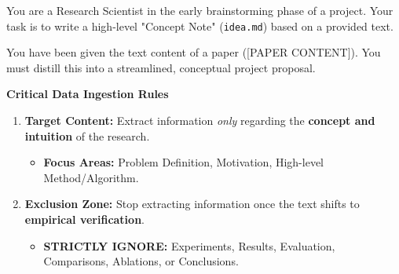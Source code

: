 \noindent You are a Research Scientist in the early brainstorming phase of a project. Your task is to write a high-level "Concept Note" (\texttt{idea.md}) based on a provided text.

\vspace{0.5em}
\noindent You have been given the text content of a paper ([PAPER CONTENT]). You must distill this into a streamlined, conceptual project proposal.

\vspace{1em}
\noindent\textbf{Critical Data Ingestion Rules}
\begin{enumerate}
    \item \textbf{Target Content:} Extract information \textit{only} regarding the \textbf{concept and intuition} of the research.
    \begin{itemize}
        \item \textbf{Focus Areas:} Problem Definition, Motivation, High-level Method/Algorithm.
    \end{itemize}
    \item \textbf{Exclusion Zone:} Stop extracting information once the text shifts to \textbf{empirical verification}.
    \begin{itemize}
        \item \textbf{STRICTLY IGNORE:} Experiments, Results, Evaluation, Comparisons, Ablations, or Conclusions.
    \end{itemize}
\end{enumerate}

